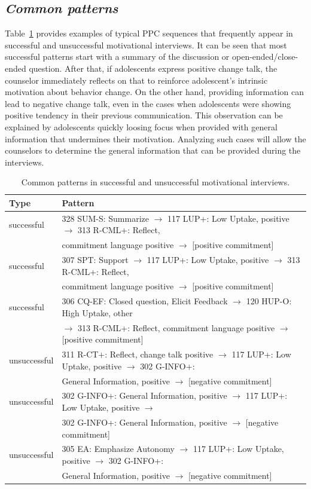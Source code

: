 \documentclass{amia_summit_2018}
\begin{document}
\subsection*{\textit{Common patterns}}
Table~\ref{tab:common_patterns} provides examples of typical PPC sequences that frequently appear in successful and unsuccessful motivational interviews. It can be seen that most successful patterns start with a summary of the discussion or open-ended/close-ended question. After that, if adolescents express positive change talk, the counselor immediately reflects on that to reinforce adolescent's intrinsic motivation about behavior change. On the other hand, providing information can lead to negative change talk, even in the cases when adolescents were showing positive tendency in their previous communication. This observation can be explained by adolescents quickly loosing focus when provided with general information that undermines their motivation. Analyzing such cases will allow the counselors to determine the general information that can be provided during the interviews. \\

\begin{table}[h]
\centering
\caption{Common patterns in successful and unsuccessful motivational interviews.}
\label{tab:common_patterns}
  \begin{tabular}{|l|l|}
  \hline
   \textbf{Type} & \textbf{Pattern} \\ \hline      
successful & 328 SUM-S: Summarize $\rightarrow $ 117 LUP+: Low Uptake, positive $\rightarrow $ 313 R-CML+: Reflect, \\ 
& commitment language positive $\rightarrow $ [positive commitment] \\\hline
successful & 307 SPT: Support $\rightarrow $ 117 LUP+: Low Uptake, positive $\rightarrow $ 313 R-CML+: Reflect, \\
& commitment language positive $\rightarrow $ [positive commitment] \\\hline
successful & 306 CQ-EF: Closed question, Elicit Feedback $\rightarrow $ 120 HUP-O: High Uptake, other \\
& $\rightarrow $ 313 R-CML+: Reflect, commitment language positive $\rightarrow $ [positive commitment] \\\hline
unsuccessful & 311 R-CT+: Reflect, change talk positive $\rightarrow $ 117 LUP+: Low Uptake, positive $\rightarrow $ 302 G-INFO+:  \\
& General Information, positive $\rightarrow $ [negative commitment] \\\hline
unsuccessful & 302 G-INFO+: General Information, positive $\rightarrow $ 117 LUP+: Low Uptake, positive $\rightarrow $  \\
& 302 G-INFO+: General Information, positive $\rightarrow $ [negative commitment] \\\hline
unsuccessful & 305 EA: Emphasize Autonomy $\rightarrow $ 117 LUP+: Low Uptake, positive $\rightarrow $ 302 G-INFO+:  \\
& General Information, positive $\rightarrow $ [negative commitment] \\\hline
  \end{tabular}
\end{table} 
\end{document}
